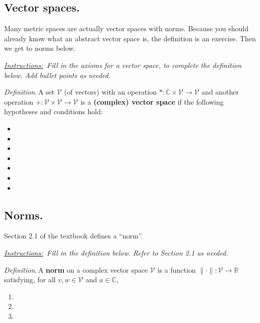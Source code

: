 \documentclass[12pt]{article}
\newcommand{\cV}{\mathcal{V}}
\newcommand{\CC}{\mathbb{C}}
\newcommand{\RR}{\mathbb{R}}
\newcommand{\sect}[1]{\subsection*{#1.}}
\newcommand{\defin}{\emph{Definition.}\,}
\newcommand{\instruct}[2]{\emph{\underline{Instructions:}\, #2} \vspace*{#1mm}}
\begin{document}
\sect{Vector spaces}  Many metric spaces are actually vector spaces with norms.  Because you should already know what an abstract vector space is, the definition is an exercise.  Then we get to norms below.

\instruct{0}{Fill in the axioms for a vector space, to complete the definition below.  Add bullet points as needed.}

\defin A set $\cV$ (of vectors) with an operation $*:\CC\times \cV \to \cV$ and another operation $+:\cV\times \cV\to \cV$ is a \textbf{(complex) vector space} if the following hypotheses and conditions hold:
\begin{itemize}
\item \phantom{x} \vspace{5mm}

\item \phantom{x} \vspace{5mm}

\item \phantom{x} \vspace{5mm}

\item \phantom{x} \vspace{5mm}

\item \phantom{x} \vspace{5mm}

\item \phantom{x} \vspace{5mm}

\item \phantom{x} \vspace{25mm}

\end{itemize}


\sect{Norms} \label{topic:norms}

Section 2.1 of the textbook defines a ``norm''.

\instruct{0}{Fill in the definition below.  Refer to Section 2.1 as needed.}

\defin A \textbf{norm} on a complex vector space $\cV$ is a function $\|\cdot\|:\cV \to \RR$ satisfying, for all $v,w\in\cV$ and $a\in \CC$,
\begin{enumerate}
\item \phantom{foo} \vspace{5mm}

\item \phantom{foo} \vspace{5mm}

\item \phantom{foo} \vspace{7mm}

\end{enumerate}
\end{document}
